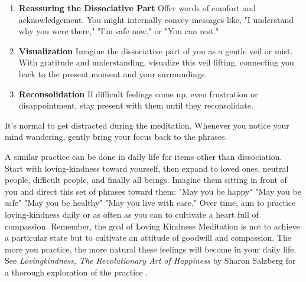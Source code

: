 \documentclass[12pt,letterpaper]{book}
\begin{document}
\begin{enumerate}
    \item \textbf{Reassuring the Dissociative Part} Offer words of comfort and acknowledgement. You might internally convey messages like, "I understand why you were there," "I'm safe now," or "You can rest."
    \item \textbf{Visualization} Imagine the dissociative part of you as a gentle veil or mist. With gratitude and understanding, visualize this veil lifting, connecting you back to the present moment and your surroundings.
    \item \textbf{Reconsolidation} If difficult feelings come up, even frustration or disappointment, stay present with them until they reconsolidate.
\end{enumerate}

It's normal to get distracted during the meditation. Whenever you notice your mind wandering, gently bring your focus back to the phrases.

A similar practice can be done in daily life for items other than dissociation. Start with loving-kindness toward yourself, then expand to loved ones, neutral people, difficult people, and finally all beings. Imagine them sitting in front of you and direct this set of phrases toward them: "May you be happy" "May you be safe" "May you be healthy" "May you live with ease." Over time, aim to practice loving-kindness daily or as often as you can to cultivate a heart full of compassion. Remember, the goal of Loving Kindness Meditation is not to achieve a particular state but to cultivate an attitude of goodwill and compassion. The more you practice, the more natural these feelings will become in your daily life. See \textit{Lovingkindness, The Revolutionary Art of Happiness} by Sharon Salzberg for a thorough exploration of the practice \cite{salzbergLovingKindness}. 
\end{document}
